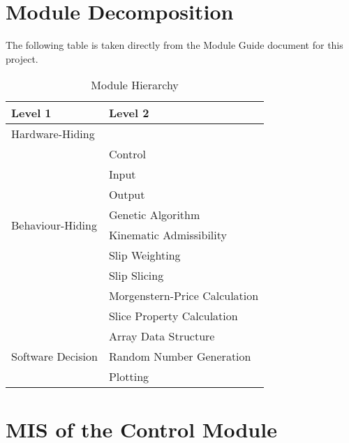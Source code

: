 \documentclass[12pt, titlepage]{article}
\begin{document}

\section{Module Decomposition}

The following table is taken directly from the Module Guide document for this 
project.

\begin{table}[h!]
	\centering
	\begin{tabular}{p{} p{} }
		\toprule
		\textbf{Level 1} & \textbf{Level 2} \\
		\midrule
		
		{Hardware-Hiding} & ~ \\
		\midrule
		
		\multirow{8}{0.3\textwidth}{Behaviour-Hiding} &
		Control \\
		& Input \\
		& Output \\
		& Genetic Algorithm \\
		& Kinematic Admissibility \\
		& Slip Weighting \\
		& Slip Slicing \\
		& Morgenstern-Price Calculation \\
		& Slice Property Calculation \\
		\midrule
		
		\multirow{3}{0.3\textwidth}{Software Decision} &
		Array Data Structure \\
		& Random Number Generation \\
		& Plotting \\
		\bottomrule
		
	\end{tabular}
	\caption{Module Hierarchy}
	\label{Table:Decomp}
\end{table}


\section{MIS of the Control Module}
\end{document}
